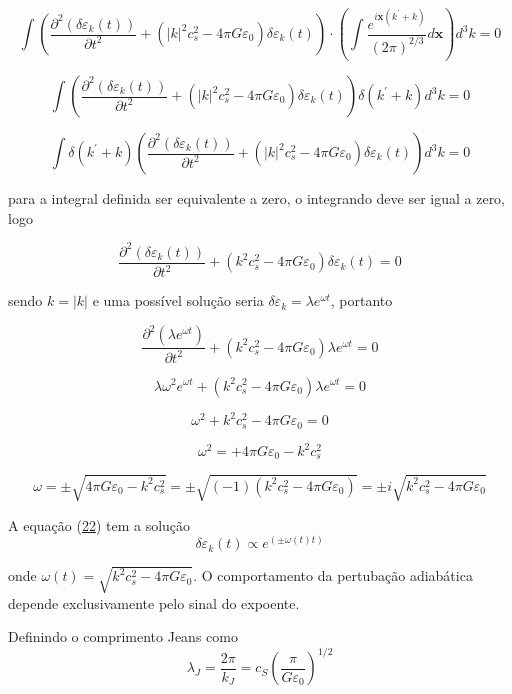 \documentclass[a4paper,12pt]{article}
\begin{document}
$$ \int \left(\dfrac{\partial^2 (\delta\varepsilon_k (t))}{\partial t^2} +(|k|^2c^2_s - 4\pi G\varepsilon_0)\delta\varepsilon_k (t)\right) \cdot\left(\int  \dfrac{e^{ i \textbf{x}(k^\prime  + k) }}{(2\pi)^{2/3}}d\textbf{x} \right)d^3k  =0$$

$$  \int \left(\dfrac{\partial^2 (\delta\varepsilon_k (t))}{\partial t^2} +(|k|^2c^2_s - 4\pi G\varepsilon_0)\delta\varepsilon_k (t)\right) \delta (k^\prime + k) d^3k  =0$$

$$  \int \delta (k^\prime + k)\left(\dfrac{\partial^2 (\delta\varepsilon_k (t))}{\partial t^2} +(|k|^2c^2_s - 4\pi G\varepsilon_0)\delta\varepsilon_k (t)\right)  d^3k  =0$$

para a integral definida ser equivalente a zero, o integrando deve ser igual a zero, logo

\begin{equation}\label{eq22}
	\dfrac{\partial^2 (\delta\varepsilon_k (t))}{\partial t^2} +(k^2c^2_s - 4\pi G\varepsilon_0)\delta\varepsilon_k (t) = 0
\end{equation}

sendo $k = |k|$ e uma possível solução seria $\delta\varepsilon_k=\lambda e^{\omega t}$, portanto

$$\dfrac{\partial^2 (\lambda e^{\omega t})}{\partial t^2} +(k^2c^2_s - 4\pi G\varepsilon_0)\lambda e^{\omega t} = 0$$

$$\lambda\omega^2 e^{\omega t} +(k^2c^2_s - 4\pi G\varepsilon_0)\lambda e^{\omega t} = 0$$

$$\omega^2  + k^2c^2_s - 4\pi G\varepsilon_0 = 0$$

$$\omega^2  =  + 4\pi G\varepsilon_0 -k^2c^2_s $$

$$\omega = \pm \sqrt{4\pi G\varepsilon_0 -k^2c^2_s} =  \pm \sqrt{(-1)(k^2c^2_s - 4\pi G\varepsilon_0) }= \pm i \sqrt{k^2c^2_s - 4\pi G\varepsilon_0} $$

A equação (\hyperref[eq22]{22}) tem a solução
\begin{equation}\label{eq23}
	\delta\varepsilon_k (t) \propto e^{(\pm \omega (t) t)}
\end{equation}

onde $\omega (t) = \sqrt{k^2c^2_s - 4\pi G \varepsilon_0}$. O comportamento da pertubação adiabática depende exclusivamente pelo sinal do expoente. 

Definindo o comprimento Jeans como
\begin{equation}\label{eq24}
	\lambda_J = \dfrac{2\pi}{k_J} = c_S \left(\dfrac{\pi}{G\varepsilon_0} \right)^{1/2}
\end{equation}
\end{document}
